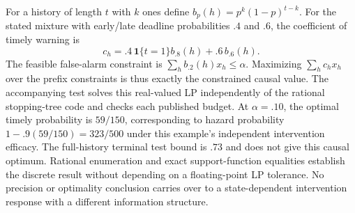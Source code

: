 For a history of length $t$ with $k$ ones define $b_p(h)=p^k(1-p)^{t-k}$. For the stated mixture with early/late deadline probabilities $.4$ and $.6$, the coefficient of timely warning is
\[
 c_h=.4\,\mathbf1\{t=1\} b_{.8}(h)+.6\,b_{.6}(h).
\]
The feasible false-alarm constraint is $\sum_h b_{.2}(h)x_h\le\alpha$. Maximizing $\sum_h c_hx_h$ over the prefix constraints is thus exactly the constrained causal value. The accompanying test solves this real-valued LP independently of the rational stopping-tree code and checks each published budget. At $\alpha=.10$, the optimal timely probability is $59/150$, corresponding to hazard probability $1-.9(59/150)=323/500$ under this example's independent intervention efficacy. The full-history terminal test bound is $.73$ and does not give this causal optimum. Rational enumeration and exact support-function equalities establish the discrete result without depending on a floating-point LP tolerance. No precision or optimality conclusion carries over to a state-dependent intervention response with a different information structure.
